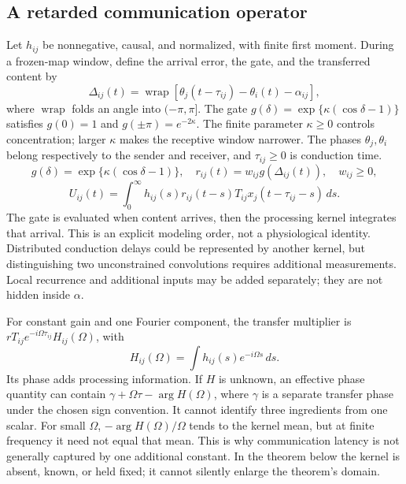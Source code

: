 \documentclass[submission,nolinenumbers]{esj}
\newcommand{\wrap}{\operatorname{wrap}}
\newcommand{\Tij}{T_{ij}}
\newcommand{\Om}{\Omega}
\newcommand{\tauij}{\tau_{ij}}
\newcommand{\Delt}{\Delta}
\begin{document}
\subsection{A retarded communication operator}\label{sec:delayed}
Let $h_{ij}$ be nonnegative, causal, and normalized, with finite first moment. During a frozen-map window, define the arrival error, the gate, and the transferred content by
\begin{equation}
\Delt_{ij}(t)=\wrap[\theta_j(t-\tauij)-\theta_i(t)-\alpha_{ij}],\label{eq:arrival}
\end{equation}
where $\wrap$ folds an angle into $(-\pi,\pi]$. The gate $g(\delta)=\exp\{\kappa(\cos\delta-1)\}$ satisfies $g(0)=1$ and $g(\pm\pi)=e^{-2\kappa}$. The finite parameter $\kappa\ge0$ controls concentration; larger $\kappa$ makes the receptive window narrower. The phases $\theta_j,\theta_i$ belong respectively to the sender and receiver, and $\tau_{ij}\ge0$ is conduction time.
\begin{equation}
g(\delta)=\exp\{\kappa(\cos\delta-1)\},\quad r_{ij}(t)=w_{ij}g(\Delt_{ij}(t)),\quad w_{ij}\ge0,\label{eq:gate}
\end{equation}
\begin{equation}
U_{ij}(t)=\int_0^\infty h_{ij}(s)r_{ij}(t-s)\Tij x_j(t-\tauij-s)\,ds.\label{eq:transfer}
\end{equation}
The gate is evaluated when content arrives, then the processing kernel integrates that arrival. This is an explicit modeling order, not a physiological identity. Distributed conduction delays could be represented by another kernel, but distinguishing two unconstrained convolutions requires additional measurements. Local recurrence and additional inputs may be added separately; they are not hidden inside $\alpha$.

For constant gain and one Fourier component, the transfer multiplier is $r\Tij e^{-i\Om\tauij}H_{ij}(\Om)$, with
\begin{equation}
H_{ij}(\Om)=\int h_{ij}(s)e^{-i\Om s}\,ds.\label{eq:kernel}
\end{equation}
Its phase adds processing information. If $H$ is unknown, an effective phase quantity can contain $\gamma+\Om\tau-\arg H(\Om)$, where $\gamma$ is a separate transfer phase under the chosen sign convention. It cannot identify three ingredients from one scalar. For small $\Om$, $-\arg H(\Om)/\Om$ tends to the kernel mean, but at finite frequency it need not equal that mean. This is why communication latency is not generally captured by one additional constant. In the theorem below the kernel is absent, known, or held fixed; it cannot silently enlarge the theorem's domain.
\end{document}
